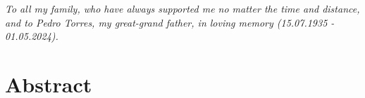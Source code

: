 \documentclass[
  12pt,
  a4paper,
  openany]{scrbook}
\renewcommand*\contentsname{Table of contents}
\newcommand\contentsname{Table of contents}
\renewcommand*\listfigurename{List of Figures}
\newcommand\listfigurename{List of Figures}
\renewcommand*\listtablename{List of Tables}
\newcommand\listtablename{List of Tables}
\begin{document}
% 
% 
% 

\let\mainmatterreal\mainmatter
\let\mainmatter\relax

\renewcommand*\contentsname{Table of contents}
\renewcommand*\listfigurename{List of figures}
\renewcommand*\listtablename{List of tables}

\mainmatter
{}

\chapter*{}\label{section}

\markboth{}{}

\hfill\break

\emph{To all my family, who have always supported me no matter the time
and distance, and to Pedro Torres, my great-grand father, in loving
memory (15.07.1935 - 01.05.2024).}


\chapter*{Abstract}\label{abstract}

\end{document}

